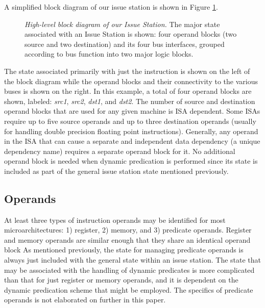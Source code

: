 \documentclass[10pt,dvips]{article}
\begin{document}
A simplified block diagram of our issue station is shown in 
Figure \ref{fig:issuestation}.
%
\begin{figure}
\centering
\scriptsize {
}
\caption{{\em High-level block diagram of our Issue Station.} 
The major state associated with an Issue Station is shown:
four operand blocks (two source and two destination)
and its four bus interfaces, grouped
according to bus function into two major logic blocks.}
\label{fig:issuestation}
\end{figure}
%
The state associated primarily with just the instruction is
shown on the left of the block diagram while the operand blocks
and their connectivity to the various buses is shown on the
right.  
In this example, a total of four operand blocks are shown, labeled:
\textit{src1}, 
\textit{src2}, 
\textit{dst1}, 
and \textit{dst2}.
The number of source and destination operand blocks that are
used for any given machine is ISA dependent.
Some ISAs require up to five source operands and up to three destination
operands (usually for handling double precision floating point 
instructions).
Generally, any operand in the ISA that can cause a separate
and independent data dependency (a unique dependency name)
requires a separate operand block for it.
No additional operand block is needed when dynamic predication
is performed since its state is included as
part of the general issue station state mentioned previously.
%
%
\subsection{Operands}
%
At least three types of instruction operands may be identified
for most microarchitectures: 
1) register, 2) memory, and 3) predicate operands.
Register and memory operands are similar enough that
they share an identical operand block
As mentioned previously, the state for managing predicate
operands is always just included with the general state within
an issue station.
The state that may be associated with the handling of
dynamic predicates is more complicated than that for
just register or memory operands, and it is dependent
on the dynamic predication scheme that might be employed.
The specifics of predicate operands is not elaborated on
further in this paper.
\end{document}
